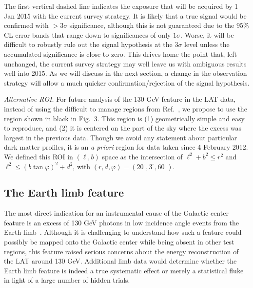 \documentclass[aps,prd,superscriptaddress,showpacs,nofootinbib,fixlfloat, 12pt]{revtex4-1}
\begin{document}
The first vertical dashed line indicates the exposure that will be acquired by
1 Jan 2015 with the current survey strategy. It is likely that a true signal
would be confirmed with $>3\sigma$ significance, although this is not
guaranteed due to the $95\%$ CL error bands that range down to significances
of only $1\sigma$. Worse, it will be difficult to robustly rule out the signal
hypothesis at the $3\sigma$ level unless the accumulated significance is close
to zero.  This drives home the point that, left unchanged, the current survey
strategy may well leave us with ambiguous results well into 2015.  As we will
discuss in the next section, a change in the observation strategy will allow a
much quicker confirmation/rejection of the signal hypothesis.
\medskip

\emph{Alternative ROI.} For future analysis of the 130 GeV feature in the LAT
data, instead of using the difficult to manage regions from
Ref.~\cite{Weniger:2012}, we propose to use the region shown in black in
Fig.~3. This region is (1) geometrically simple and easy to reproduce, and (2)
it is centered on the part of the sky where the excess was largest in the
previous data. Though we avoid any statement about particular dark matter
profiles, it is an \emph{a priori} region for data taken since 4 February
2012. We defined this ROI in $(\ell, b)$ space as the intersection of
$\ell^2+b^2\leq
r^2$ and $\ell^2\leq (b\tan\varphi)^2 + d^2$, with $(r, d, \varphi) =
(20^\circ, 3^\circ, 60^\circ)$. 

\subsection{The Earth limb feature}
The most direct indication for an instrumental cause of the Galactic center
feature is an excess of 130 GeV photons in low incidence angle events from
the Earth limb~\cite{linepaper, finkbeiner_systematics, Hektor:2012ev,
bloom_charles_fermi_lat_line}. Although it is challenging to understand how
such a feature could possibly be mapped onto the Galactic center while being
absent in other test regions, this feature raised serious concerns about the
energy reconstruction of the LAT around 130 GeV.  Additional limb data would
determine whether the Earth limb feature is indeed a true systematic effect or
merely a statistical fluke in light of a large number of hidden trials.
\end{document}
